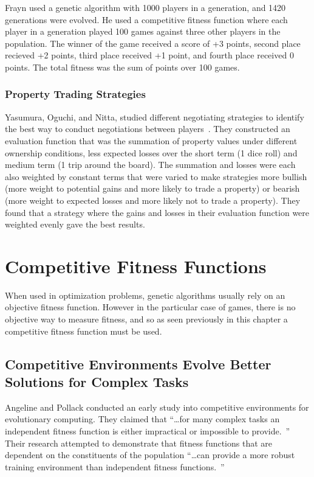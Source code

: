 Frayn used a genetic algorithm with 1000 players in a generation, and 1420
generations were evolved. He used a competitive fitness function where each
player in a generation played 100 games against three other players in the
population. The winner of the game received a score of +3 points, second place
recieved +2 points, third place received +1 point, and fourth place received 0
points. The total fitness was the sum of points over 100 games.

\subsubsection{Property Trading Strategies} \label{3_trading}

Yasumura, Oguchi, and Nitta, studied different negotiating strategies to
identify the best way to conduct negotiations between
players~\cite{Yasumura2001Negotiate}. They constructed an evaluation function
that was the summation of property values under different ownership conditions,
less expected losses over the short term (1 dice roll) and medium term (1 trip
around the board). The summation and losses were each also weighted by constant
terms that were varied to make strategies more bullish (more weight to potential
gains and more likely to trade a property) or bearish (more weight to expected
losses and more likely not to trade a property). They found that a strategy
where the gains and losses in their evaluation function were weighted evenly
gave the best results.

\section{Competitive Fitness Functions}

When used in optimization problems, genetic algorithms usually rely on an
objective fitness function. However in the particular case of games, there is no
objective way to measure fitness, and so as seen previously in this chapter a
competitive fitness function must be used.

\subsection{Competitive Environments Evolve Better Solutions for Complex Tasks}

Angeline and Pollack conducted an early study into competitive environments for
evolutionary computing. They claimed that ``\ldots for many complex tasks an
independent fitness function is either impractical or impossible to
provide.~\cite{Angeline:1993:CEE:645513.657590}'' Their research attempted to
demonstrate that fitness functions that are dependent on the constituents of the
population ``\ldots can provide a more robust training environment than
independent fitness functions.~\cite{Angeline:1993:CEE:645513.657590}''

